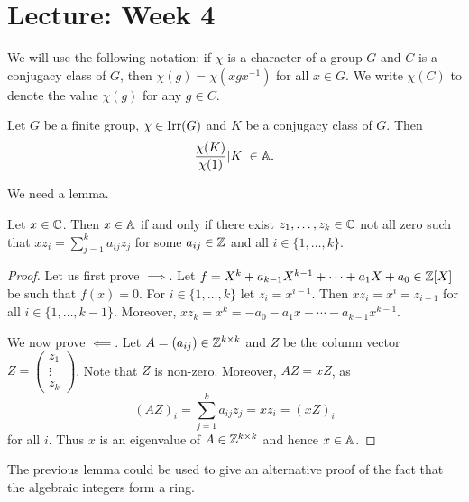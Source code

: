 \section{Lecture: Week 4}

We will use the following notation: if $\chi$ is a character
of a group $G$ 
and $C$ is a conjugacy class of $G$, then 
$\chi(g)=\chi(xgx^{-1})$ for all $x\in G$. We write 
$\chi(C)$ to denote the value $\chi(g)$ for any $g\in C$. 

\begin{theorem}
\label{thm:B}
    Let $G$ be a finite group, $\chi\in\operatorname{Irr}(G)$ 
    and $K$ be a conjugacy class of $G$. Then 
    \[
    \frac{\chi(K)}{\chi(1)}|K|\in\mathbb{A}. 
    \]
\end{theorem}

We need a lemma. 

\begin{lemma}
    Let $x\in\mathbb{C}$. Then $x\in\mathbb{A}$ if and only if 
    there exist $z_1,\dots,z_k\in\mathbb{C}$ not all zero such that 
    $xz_i=\sum_{j=1}^ka_{ij}z_j$ for some $a_{ij}\in\mathbb{Z}$ and 
    all $i\in\{1,\dots,k\}$. 
\end{lemma}

\begin{proof}
    Let us first prove $\implies$. Let $f=X^k+a_{k-1}X^{k-1}+\cdots+a_1X+a_0\in\mathbb{Z}[X]$
    be such that $f(x)=0$. For $i\in\{1,\dots,k\}$ let 
    $z_i=x^{i-1}$. Then 
    $xz_i=x^i=z_{i+1}$ for all $i\in\{1,\dots,k-1\}$. Moreover, 
    $xz_k=x^k=-a_0-a_1x-\cdots-a_{k-1}x^{k-1}$.
    
    We now prove $\impliedby$. Let $A=(a_{ij})\in\mathbb{Z}^{k\times k}$ and 
    $Z$ be the column vector 
    $Z=\begin{pmatrix}z_1\\\vdots\\z_k\end{pmatrix}$. Note that $Z$ is non-zero. 
    Moreover, $AZ=xZ$, as 
    \[
    (AZ)_i=\sum_{j=1}^ka_{ij}z_j=xz_i=(xZ)_i
    \]
    for all $i$. Thus $x$ is an eigenvalue of $A\in\mathbb{Z}^{k\times k}$ and
    hence $x\in\mathbb{A}$. 
\end{proof}

The previous lemma could be used to give an alternative proof of the fact 
that the algebraic integers form a ring. 


